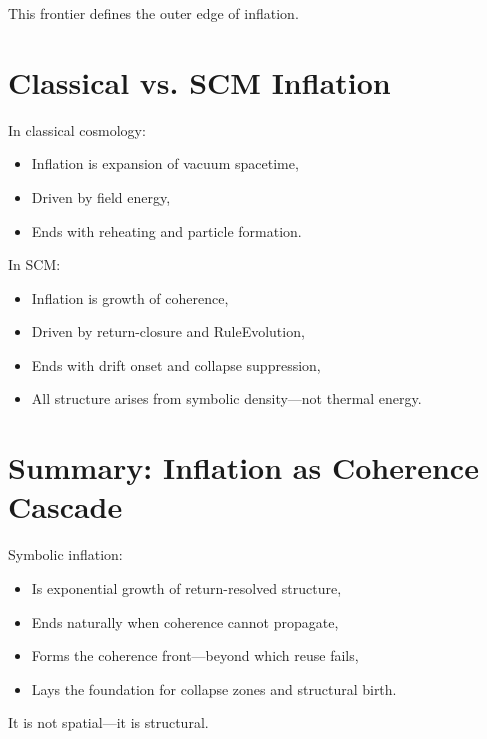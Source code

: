 This frontier defines the outer edge of inflation.

\section{Classical vs. SCM Inflation} \label{sec:comparison-inflation}

In classical cosmology:
\begin{itemize}
  \item Inflation is expansion of vacuum spacetime,
  \item Driven by field energy,
  \item Ends with reheating and particle formation.
\end{itemize}

In SCM:
\begin{itemize}
  \item Inflation is growth of coherence,
  \item Driven by return-closure and RuleEvolution,
  \item Ends with drift onset and collapse suppression,
  \item All structure arises from symbolic density—not thermal energy.
\end{itemize}

\section{Summary: Inflation as Coherence Cascade} \label{sec:inflation-summary}

Symbolic inflation:
\begin{itemize}
  \item Is exponential growth of return-resolved structure,
  \item Ends naturally when coherence cannot propagate,
  \item Forms the coherence front—beyond which reuse fails,
  \item Lays the foundation for collapse zones and structural birth.
\end{itemize}

It is not spatial—it is structural.

